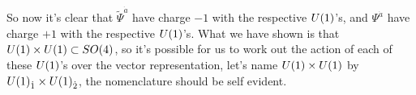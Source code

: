 So now it's clear that ${\tilde\Psi}^{\dot a}$ have charge $-1$ with the respective $U\qty(1)$'s, and $\Psi^{\dot a}$ have charge $+1$ with the 
respective $U\qty(1)$'s. What we have shown is that $U\qty(1)\times U\qty(1)\subset SO\qty(4)$, so it's possible for us to work out the action of each of these $U\qty(1)$'s over the vector representation, 
let's name $U\qty(1)\times U\qty(1)$ by $U\qty(1)_{\dot 1}\times U\qty(1)_{\dot 2}$, the nomenclature should be self evident.